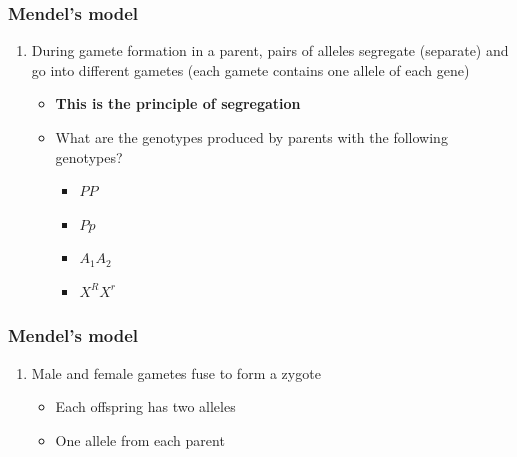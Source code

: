 \begin{frame}
    \frametitle{Mendel's model}
    \begin{enumerate}
        \addtocounter{enumi}{4}
        \item During gamete formation in a parent, pairs of alleles segregate
            (separate) and go into different gametes (each gamete contains one
            allele of each gene)
            \begin{itemize}
                \item \textbf{This is the principle of segregation}
                \item<2-> What are the  genotypes produced
                    by parents with the following genotypes?
                    \begin{itemize}
                        \item<2-> $PP$ \hspace{9mm}
                            \vspace{3mm}
                        \item<2-> $Pp$ \hspace{10mm}
                            \vspace{3mm}
                        \item<2-> $A_{1}A_{2}$ \hspace{6mm}
                            \vspace{3mm}
                        \item<2-> $X^{R}X^{r}$ \hspace{5mm}
                    \end{itemize}
            \end{itemize}
    \end{enumerate}
\end{frame}

\begin{frame}
    \frametitle{Mendel's model}
    \begin{enumerate}
        \addtocounter{enumi}{5}
        \item Male and female gametes fuse to form a zygote
            \begin{itemize}
                \item Each offspring has two alleles
                \item One allele from each parent
            \end{itemize}
    \end{enumerate}
\end{frame}


